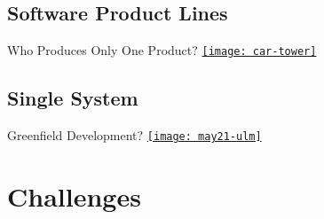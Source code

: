 \documentclass[
	aspectratio=169, %
	8pt, %
	handout, %
]{beamer}
\begin{document}
\subsection{Software Product Lines}
\begin{frame}{Who Produces Only One Product?}
	\href{https://pxhere.com/en/photo/920906}{\texttt{[image: car-tower]}}
\end{frame}

\subsection{Single System}

\begin{frame}{Greenfield Development? }
	\href{https://github.com/SoftVarE-Group/SlideTemplate/blob/main/pics/nature/may21-ulm.jpg}{\texttt{[image: may21-ulm]}}
\end{frame}




%

\lessonslearned{
	\item \ldots
}{
	\item \ldots
}{
	\ldots
}

\sectionend

\section{Challenges}


\end{document}
